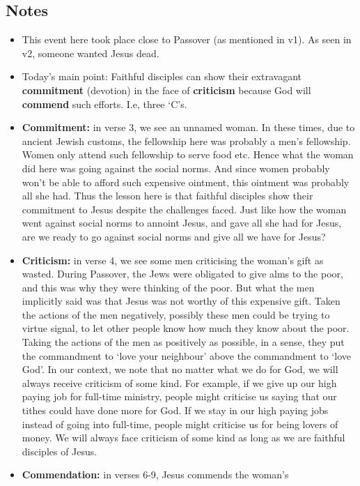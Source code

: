 \subsection*{Notes}
\begin{itemize}
  \item{This event here took place close to Passover (as mentioned in v1).
  As seen in v2, someone wanted Jesus dead.}
  \item{Today's main point: Faithful disciples can show their extravagant
  \textbf{commitment} (devotion) in the face of \textbf{criticism} because
  God will \textbf{commend} such efforts. I.e, three `C's.}
  \item{\textbf{Commitment:} in verse 3, we see an unnamed woman.  In these
  times, due to ancient Jewish customs, the fellowship here was probably a
  men's fellowship.  Women only attend such fellowship to serve food etc.
  Hence what the woman did here was going against the social norms.  And
  since women probably won't be able to afford such expensive ointment, this
  ointment was probably all she had.  Thus the lesson here is that faithful
  disciples show their commitment to Jesus despite the challenges
  faced.  Just like how the woman went against social norms to annoint Jesus,
  and gave all she had for Jesus, are we ready to go against social norms and
  give all we have for Jesus?}
  \item{\textbf{Criticism:} in verse 4, we see some men criticising the
  woman's gift as wasted.  During Passover, the Jews were obligated to give
  alms to the poor, and this was why they were thinking of the poor.  But
  what the men implicitly said was that Jesus was not worthy of this
  expensive gift.  Taken the actions of the men negatively, possibly these
  men could be trying to virtue signal, to let other people know how much
  they know about the poor.  Taking the actions of the men as positively as
  possible, in a sense, they put the commandment to `love your neighbour'
  above the commandment to `love God'.  In our context, we note that no
  matter what we do for God, we will always receive criticism of some kind.
  For example, if we give up our high paying job for full-time ministry,
  people might criticise us saying that our tithes could have done more for
  God.  If we stay in our high paying jobs instead of going into full-time,
  people might criticise us for being lovers of money.  We will always face
  criticism of some kind as long as we are faithful disciples of Jesus.}
  \item{\textbf{Commendation:} in verses 6-9, Jesus commends the woman's
}
\end{itemize}
